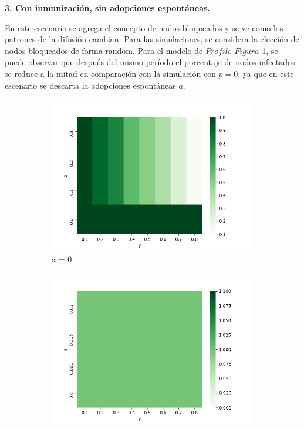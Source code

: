 \documentclass{article}
\begin{document}
\textbf{3. Con inmunización, sin adopciones espontáneas.}

En este escenario se agrega el concepto de nodos bloqueados y se ve como los patrones de la difusión cambian. Para las simulaciones, se considera la elección de nodos bloqueados de forma random. Para el modelo de $Profile$ $Figura $ \ref{fig:hm05}, se puede observar que después del mismo período el porcentaje de nodos infectados se reduce a la mitad en comparación con la simulación con $p = 0$, ya que en este escenario se descarta la adopciones espontáneas $a$.

\begin{figure}[h]
	\begin{subfigure}[b]{0.5\textwidth}
		\includegraphics[width=\textwidth]{../Images/hm05.png}
		\caption{a = 0}
		\label{fig:hm05}
	\end{subfigure}
	\hfill
	\begin{subfigure}[b]{0.5\textwidth}
		\includegraphics[width=\textwidth]{../Images/hm06.png}

\end{subfigure}
\end{figure}
\end{document}
